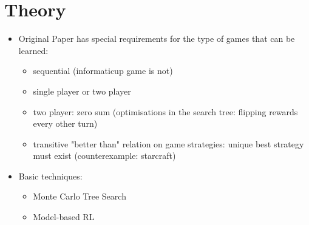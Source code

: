 \chapter{Theory}

\begin{itemize}
    \item Original Paper has special requirements for the type of games
    that can be learned:
    \begin{itemize}
        \item sequential (informaticup game is not)
        \item single player or two player
        \item two player: zero sum (optimisations in the search tree:
        flipping rewards every other turn)
        \item transitive "better than" relation on game strategies: unique best
        strategy must exist (counterexample: starcraft)
    \end{itemize}
    \item Basic techniques:
    \begin{itemize}
        \item Monte Carlo Tree Search \cite{mcts_survey}
        \item Model-based RL
    \end{itemize}
\end{itemize}
